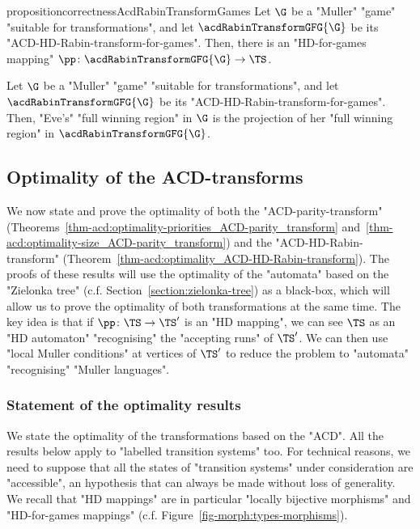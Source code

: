 \documentclass[10pt,a4paper]{amsart}
\newcommand{\Eve}{\mathrm{Eve}}
\begin{document}
\begin{restatable}{proposition}{correctnessAcdRabinTransformGames}\label{prop-ACD:correctness_ACD-HD-Rabin-transform-games}
	Let $\G$ be a "Muller" "game" "suitable for transformations", and let $\acdRabinTransformGFG{\G}$ be its "ACD-HD-Rabin-transform-for-games". Then, there is an "HD-for-games mapping" $\pp\colon \acdRabinTransformGFG{\G} \to \TS$.
\end{restatable}
\begin{corollary}
	Let $\G$ be a "Muller" "game" "suitable for transformations", and let $\acdRabinTransformGFG{\G}$ be its "ACD-HD-Rabin-transform-for-games". Then, "Eve's" "full winning region" in $\G$ is the projection of her "full winning region" in $\acdRabinTransformGFG{\G}$.%
\end{corollary}

\subsection{Optimality of the ACD-transforms}\label{subsec-acd-parity: optimality}
We now state and prove the optimality of both the "ACD-parity-transform" (Theorems~\ref{thm-acd:optimality-priorities_ACD-parity_transform} and~\ref{thm-acd:optimality-size_ACD-parity_transform}) and the "ACD-HD-Rabin-transform" (Theorem~\ref{thm-acd:optimality_ACD-HD-Rabin-transform}).
The proofs of these results will use the optimality of the "automata" based on the "Zielonka tree" (c.f. Section~\ref{section:zielonka-tree}) as a black-box, which will allow us to prove the optimality of both transformations at the same time.
The key idea is that if $\pp\colon \TS \to \TS'$ is an "HD mapping", we can see $\TS$ as an "HD automaton" "recognising" the "accepting runs" of $\TS'$. We can then use "local Muller conditions" at vertices of $\TS'$ to reduce the problem to "automata" "recognising" "Muller languages".

\subsubsection{Statement of the optimality results}
We state the optimality of the transformations based on the "ACD". All the results below apply to "labelled transition systems" too.  For technical reasons, we need to suppose that all the states of "transition systems" under consideration are "accessible", an hypothesis that can always be made without loss of generality. We recall that "HD mappings" are in particular "locally bijective morphisms" and "HD-for-games mappings" (c.f. Figure~\ref{fig-morph:types-morphisms}).
\end{document}
